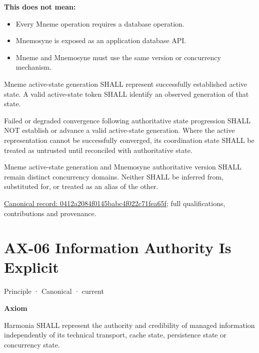 \textbf{This does not mean:}



\begin{itemize}


\item Every Mneme operation requires a database operation.

\item Mnemosyne is exposed as an application database API.

\item Mneme and Mnemosyne must use the same version or concurrency mechanism.

\end{itemize}


Mneme active-state generation SHALL represent successfully established active state. A valid active-state token SHALL identify an observed generation of that state.



Failed or degraded convergence following authoritative state progression SHALL NOT establish or advance a valid active-state generation. Where the active representation cannot be successfully converged, its coordination state SHALL be treated as untrusted until reconciled with authoritative state.



Mneme active-state generation and Mnemosyne authoritative version SHALL remain distinct concurrency domains. Neither SHALL be inferred from, substituted for, or treated as an alias of the other.


{\footnotesize \href{../../../../continuum/motivation/principle/0412a2084f0145babc4f022c71fea65f.md}{Canonical record: 0412a2084f0145babc4f022c71fea65f}; full qualifications, contributions and provenance.}\par
\section{AX-06 Information Authority Is Explicit}

\label{element:952c3b6148ce4fce94b69f99a0c2fec7}
{\small Principle · Canonical · current}\par

\par\medskip\textbf{Axiom}\par


Harmonia SHALL represent the authority and credibility of managed
information independently of its technical transport, cache state,
persistence state or concurrency state.



